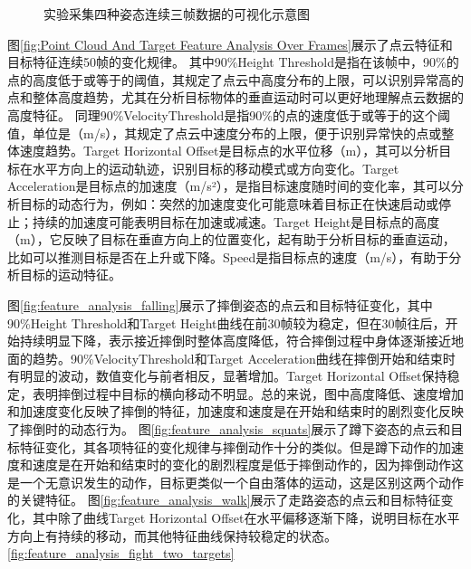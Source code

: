 \begin{figure}[htbp]
    \ContinuedFloat
	\centering
	\caption{实验采集四种姿态连续三帧数据的可视化示意图}
	\label{fig:posture_visualization}
\end{figure}

图\eqref{fig:Point Cloud  And Target Feature Analysis Over Frames}展示了点云特征和目标特征连续50帧的变化规律。
其中90\%Height Threshold是指在该帧中，90\%的点的高度低于或等于的阈值，其规定了点云中高度分布的上限，可以识别异常高的点和整体高度趋势，尤其在分析目标物体的垂直运动时可以更好地理解点云数据的高度特征。
同理90\%VelocityThreshold是指90\%的点的速度低于或等于的这个阈值，单位是（m/s），其规定了点云中速度分布的上限，便于识别异常快的点或整体速度趋势。Target Horizontal Offset是目标点的水平位移（m），其可以分析目标在水平方向上的运动轨迹，识别目标的移动模式或方向变化。Target Acceleration是目标点的加速度（m/s²），是指目标速度随时间的变化率，其可以分析目标的动态行为，例如：突然的加速度变化可能意味着目标正在快速启动或停止；持续的加速度可能表明目标在加速或减速。Target Height是目标点的高度（m），它反映了目标在垂直方向上的位置变化，起有助于分析目标的垂直运动，比如可以推测目标是否在上升或下降。Speed是指目标点的速度（m/s），有助于分析目标的运动特征。

图\eqref{fig:feature_analysis_falling}展示了摔倒姿态的点云和目标特征变化，其中90\%Height Threshold和Target Height曲线在前30帧较为稳定，但在30帧往后，开始持续明显下降，表示接近摔倒时整体高度降低，符合摔倒过程中身体逐渐接近地面的趋势。90\%VelocityThreshold和Target Acceleration曲线在摔倒开始和结束时有明显的波动，数值变化与前者相反，显著增加。Target Horizontal Offset保持稳定，表明摔倒过程中目标的横向移动不明显。总的来说，图中高度降低、速度增加和加速度变化反映了摔倒的特征，加速度和速度是在开始和结束时的剧烈变化反映了摔倒时的动态行为。
图\eqref{fig:feature_analysis_squats}展示了蹲下姿态的点云和目标特征变化，其各项特征的变化规律与摔倒动作十分的类似。但是蹲下动作的加速度和速度是在开始和结束时的变化的剧烈程度是低于摔倒动作的，因为摔倒动作这是一个无意识发生的动作，目标更类似一个自由落体的运动，这是区别这两个动作的关键特征。
图\eqref{fig:feature_analysis_walk}展示了走路姿态的点云和目标特征变化，其中除了曲线Target Horizontal Offset在水平偏移逐渐下降，说明目标在水平方向上有持续的移动，而其他特征曲线保持较稳定的状态。
\eqref{fig:feature_analysis_fight_two_targets}



